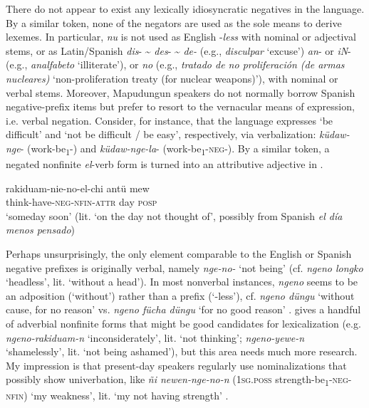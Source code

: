 \documentclass[output=paper,colorlinks,citecolor=brown,draft]{langscibook}
\begin{document}
There do not appear to exist any lexically idiosyncratic negatives in the language. By a similar token, none of the negators are used as the sole means to derive lexemes. In particular, \textit{nu} is not used as English \nobreakdash-\textit{less} with nominal or adjectival stems, or as Latin/Spanish \textit{dis}{}- {\textasciitilde} \textit{des}{}- {\textasciitilde} \textit{de-} (e.g., \textit{disculpar} ‘excuse’) \textit{an}{}- or \textit{iN}{}- (e.g., \textit{analfabeto} ‘illiterate’), or \textit{no} (e.g., \textit{tratado de no proliferación (de armas nucleares)} ‘non-proliferation treaty (for nuclear weapons)’), with nominal or verbal stems. Moreover, Mapudungun speakers do not normally borrow Spanish negative-prefix items but prefer to resort to the vernacular means of expression, i.e. verbal negation. Consider, for instance, that the language expresses ‘be difficult’ and ‘not be difficult / be easy’, respectively, via verbalization: \textit{küdaw-nge}{}- (work-be\textsubscript{1}{}-) and \textit{küdaw-nge-la}{}- (work-be\textsubscript{1}{}-\textsc{neg}{}-). By a similar token, a negated nonfinite \textit{el}{}-verb form is turned into an attributive adjective in .

\ea\label{ex:mapu:24}
    \gll rakiduam-nie-no-el-chi    antü  mew \\ 
         think-have-\textsc{neg-nfin-attr} day  \textsc{posp} \\
    \glt ‘someday soon’ (lit. ‘on the day not thought of’, possibly from Spanish \textit{el día menos pensado}) \citep[119]{Augusta1916}
\z 

Perhaps unsurprisingly, the only element comparable to the English or Spanish negative prefixes is originally verbal, namely \textit{nge-no-} ‘not being’ (cf. \textit{ngeno longko} ‘headless’, lit. ‘without a head’). In most nonverbal instances, \textit{ngeno} seems to be an adposition (‘without’) rather than a prefix (‘\nobreakdash-less’), cf. \textit{ngeno düngu} ‘without cause, for no reason’ vs. \textit{ngeno fücha düngu} ‘for no good reason’ \citep[67]{Augusta1916}. \citet{Augusta1916} gives a handful of adverbial nonfinite forms that might be good candidates for lexicalization (e.g. \textit{ngeno-rakiduam-n} ‘inconsiderately’, lit. ‘not thinking’; \textit{ngeno-yewe-n} ‘shamelessly’, lit. ‘not being ashamed’), but this area needs much more research. My impression is that present-day speakers regularly use nominalizations that possibly show univerbation, like \textit{ñi newen-nge-no-n} (\textsc{1sg.poss} strength-be\textsc{\textsubscript{1}}\textsc{{}-neg-nfin}) ‘my weakness’, lit. ‘my not having strength’ \citep[102]{Augusta1916}. 
\end{document}
